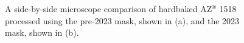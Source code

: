 \documentclass[
  a4paper,
]{scrbook}
\begin{document}
\begin{figure}
\begin{minipage}[t]{0.01\linewidth}
\end{minipage}%
%
\begin{minipage}[t]{0.03\linewidth}

{\centering 


}

\end{minipage}%
%
\begin{minipage}[t]{0.01\linewidth}

{\centering 

~

}

\end{minipage}%
%
\begin{minipage}[t]{0.45\linewidth}

{\centering 


}

\end{minipage}%
%
\begin{minipage}[t]{0.01\linewidth}

{\centering 

~

}

\end{minipage}%

\caption{\label{fig-microscope-encapsulation}A side-by-side microscope
comparison of hardbaked AZ\(^\circledR\) 1518 processed using the
pre-2023 mask, shown in (a), and the 2023 mask, shown in (b).}

\end{figure}
\end{document}
